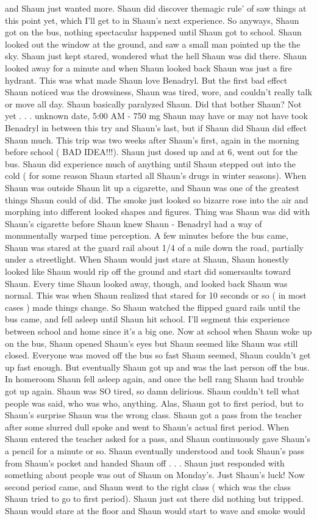 \documentclass[12pt]{book}
\begin{document}
and Shaun just wanted more. Shaun did discover themagic rule' of saw things at this point yet, which I'll get to in Shaun's next experience. So anyways, Shaun got on the bus, nothing spectacular happened until Shaun got to school. Shaun looked out the window at the ground, and saw a small man pointed up the the sky. Shaun just kept stared, wondered what the hell Shaun was did there. Shaun looked away for a minute and when Shaun looked back Shaun was just a fire hydrant. This was what made Shaun love Benadryl. But the first bad effect Shaun noticed was the drowsiness, Shaun was tired, wore, and couldn't really talk or move all day. Shaun basically paralyzed Shaun. Did that bother Shaun? Not yet . . .  unknown date, 5:00 AM - 750 mg Shaun may have or may not have took Benadryl in between this try and Shaun's last, but if Shaun did Shaun did effect Shaun much. This trip was two weeks after Shaun's first, again in the morning before school ( BAD IDEA!!!). Shaun just dosed up and at 6, went out for the bus. Shaun did experience much of anything until Shaun stepped out into the cold ( for some reason Shaun started all Shaun's drugs in winter seasons). When Shaun was outside Shaun lit up a cigarette, and Shaun was one of the greatest things Shaun could of did. The smoke just looked so bizarre rose into the air and morphing into different looked shapes and figures. Thing was Shaun was did with Shaun's cigarette before Shaun knew Shaun - Benadryl had a way of monumentally warped time perception. A few minutes before the bus came, Shaun was stared at the guard rail about 1/4 of a mile down the road, partially under a streetlight. When Shaun would just stare at Shaun, Shaun honestly looked like Shaun would rip off the ground and start did somersaults toward Shaun. Every time Shaun looked away, though, and looked back Shaun was normal. This was when Shaun realized that stared for 10 seconds or so ( in most cases ) made things change. So Shaun watched the flipped guard rails until the bus came, and fell asleep until Shaun hit school. I'll segment this experience between school and home since it's a big one. Now at school when Shaun woke up on the bus, Shaun opened Shaun's eyes but Shaun seemed like Shaun was still closed. Everyone was moved off the bus so fast Shaun seemed, Shaun couldn't get up fast enough. But eventually Shaun got up and was the last person off the bus. In homeroom Shaun fell asleep again, and once the bell rang Shaun had trouble got up again. Shaun was SO tired, so damn delirious. Shaun couldn't tell what people was said, who was who, anything. Alas, Shaun got to first period, but to Shaun's surprise Shaun was the wrong class. Shaun got a pass from the teacher after some slurred dull spoke and went to Shaun's actual first period. When Shaun entered the teacher asked for a pass, and Shaun continuously gave Shaun's a pencil for a minute or so. Shaun eventually understood and took Shaun's pass from Shaun's pocket and handed Shaun off . . .  Shaun just responded with something about people was out of Shaun on Monday's. Just Shaun's luck! Now second period came, and Shaun went to the right class ( which was the class Shaun tried to go to first period). Shaun just sat there did nothing but tripped. Shaun would stare at the floor and Shaun would start to wave and smoke would 
\end{document}
